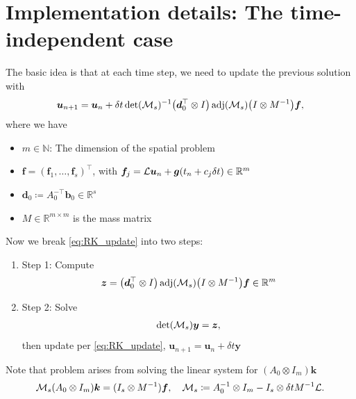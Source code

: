 \documentclass[review]{siamart}
\newcommand{\mdet}{\operatorname{det}}
\newcommand{\madj}{\operatorname{adj}}
\begin{document}
\section{Implementation details:  The time-independent case}

The basic idea is that at each time step, we need to update the previous solution with
\begin{align} \label{eq:RK_update}
\bm{u}_{n+1}  = \bm{u}_n + \delta t \mdet({\cal M}_s)^{-1} \big( \bm{d}^\top_0 \otimes I \big) \madj({\cal M}_s) \big( I \otimes M^{-1} \big) \bm{f},
\end{align}
where we have
\begin{itemize}
\item $m \in \mathbb{N}$: The dimension of the spatial problem

\item $\bm{f} = (\bm{f}_1, \ldots, \bm{f}_s)^\top$, with $\bm{f}_j = {\cal L} \bm{u}_n + \bm{g}(t_n + c_j \delta t) \in \mathbb{R}^m$

\item $\bm{d}_0 \coloneqq A^{-\top}_0 \bm{b}_0 \in \mathbb{R}^{s}$ 

\item $M \in \mathbb{R}^{m \times m}$ is the mass matrix
\end{itemize}

Now we break \eqref{eq:RK_update} into two steps:
\begin{enumerate}
\item{Step 1:}\label{it:update_step1} Compute 
\begin{align} \label{eq:step1}
\bm{z} = \big( \bm{d}^\top_0 \otimes I \big) \madj ({\cal M}_s) \big(I \otimes M^{-1} \big)\bm{f} \in \mathbb{R}^m
\end{align}

\item{Step 2:}\label{it:update_step2} Solve
\begin{align} \label{eq:step2}
\mdet( {\cal M}_s ) \bm{y} = \bm{z},
\end{align}
then update per \eqref{eq:RK_update}, $\bm{u}_{n+1} = \bm{u}_n + \delta t \bm{y}$
\end{enumerate}

Note that problem arises from solving the linear system for $(A_0 \otimes I_m) \bm{k}$
\begin{align}
{\cal M}_s (A_0 \otimes I_m) \bm{k} = (I_s \otimes M^{-1}) \bm{f}, 
\quad 
{\cal M}_s \coloneqq A_0^{-1} \otimes I_m - I_s \otimes \delta t M^{-1} {\cal L}.
\end{align}
\end{document}

